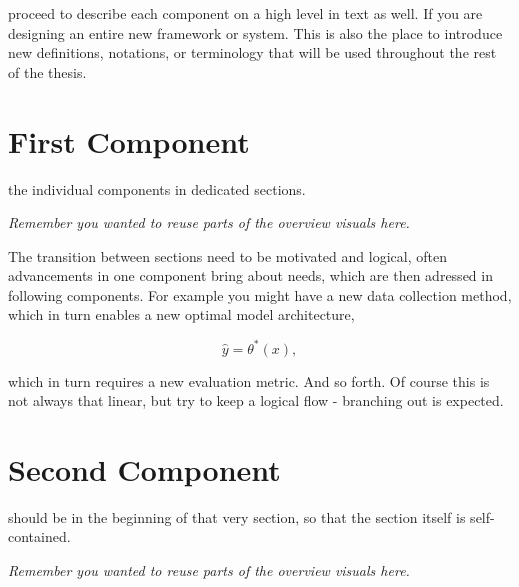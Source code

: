  proceed to describe each component on a high level in text as well. If you are designing an entire new framework or system. 
This is also the place to introduce new definitions, notations, or terminology that will be used throughout the rest of the thesis.



\bigskip
\section{First Component}
 the individual components in dedicated sections. 

\textit{Remember you wanted to reuse parts of the overview visuals here.}

The transition between sections need to be motivated and logical, often advancements in one component bring about needs, 
which are then adressed in following components. For example you might have a new data collection method, which in turn enables a new optimal model architecture,

\begin{equation}
\hat{y} = \theta^*(x),
\end{equation}

which in turn requires a new evaluation metric. And so forth.
Of course this is not always that linear, but try to keep a logical flow - branching out is expected.

\section{Second Component}
 should be in the beginning of that very section, 
so that the section itself is self-contained. 

\textit{Remember you wanted to reuse parts of the overview visuals here.}

